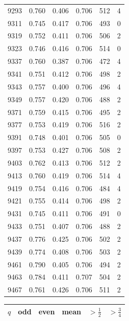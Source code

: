 \documentclass[11pt,a4paper,reqno]{amsart}
\theoremstyle{remark}
\numberwithin{equation}{section}
\begin{document}
\begin{table}[p]
\begin{tabular}{@{}rccccr@{}}
9293 & 0.760 & 0.406 & 0.706 & 512 & 4\\
9311 & 0.745 & 0.417 & 0.706 & 493 & 0\\
9319 & 0.752 & 0.411 & 0.706 & 506 & 2\\
9323 & 0.746 & 0.416 & 0.706 & 514 & 0\\
9337 & 0.760 & 0.387 & 0.706 & 472 & 4\\
9341 & 0.751 & 0.412 & 0.706 & 498 & 2\\
9343 & 0.757 & 0.400 & 0.706 & 496 & 4\\
9349 & 0.757 & 0.420 & 0.706 & 488 & 2\\
9371 & 0.759 & 0.415 & 0.706 & 495 & 2\\
9377 & 0.753 & 0.419 & 0.706 & 516 & 2\\
9391 & 0.748 & 0.401 & 0.706 & 505 & 0\\
9397 & 0.753 & 0.427 & 0.706 & 508 & 2\\
9403 & 0.762 & 0.413 & 0.706 & 512 & 2\\
9413 & 0.760 & 0.419 & 0.706 & 514 & 4\\
9419 & 0.754 & 0.416 & 0.706 & 484 & 4\\
9421 & 0.755 & 0.414 & 0.706 & 498 & 2\\
9431 & 0.745 & 0.411 & 0.706 & 491 & 0\\
9433 & 0.751 & 0.407 & 0.706 & 488 & 2\\
9437 & 0.776 & 0.425 & 0.706 & 502 & 2\\
9439 & 0.774 & 0.408 & 0.706 & 503 & 2\\
9461 & 0.790 & 0.405 & 0.706 & 494 & 2\\
9463 & 0.784 & 0.411 & 0.707 & 504 & 2\\
9467 & 0.761 & 0.426 & 0.706 & 511 & 2\\
\bottomrule
\end{tabular}
\hspace{1em}
\begin{tabular}{@{}rccccr@{}}
\toprule
$q$ & odd & even & mean & $>\tfrac12$ & $>\tfrac34$\\
\midrule


\end{tabular}
\end{table}
\end{document}
